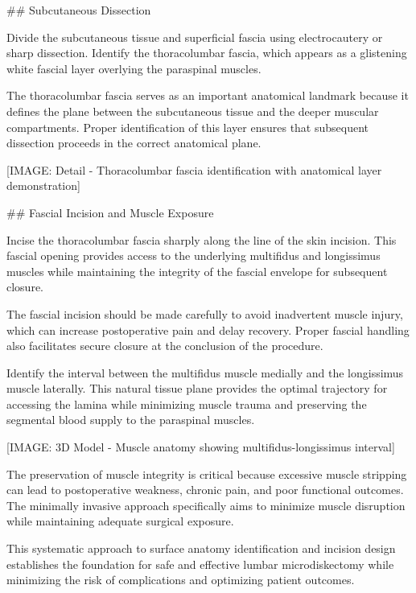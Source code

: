 \documentclass[12pt,a4paper]{article}
\begin{document}
\#\# Subcutaneous Dissection

Divide the subcutaneous tissue and superficial fascia using electrocautery or sharp dissection. Identify the thoracolumbar fascia, which appears as a glistening white fascial layer overlying the paraspinal muscles.

The thoracolumbar fascia serves as an important anatomical landmark because it defines the plane between the subcutaneous tissue and the deeper muscular compartments. Proper identification of this layer ensures that subsequent dissection proceeds in the correct anatomical plane.

[IMAGE: Detail - Thoracolumbar fascia identification with anatomical layer demonstration]

\#\# Fascial Incision and Muscle Exposure

Incise the thoracolumbar fascia sharply along the line of the skin incision. This fascial opening provides access to the underlying multifidus and longissimus muscles while maintaining the integrity of the fascial envelope for subsequent closure.

The fascial incision should be made carefully to avoid inadvertent muscle injury, which can increase postoperative pain and delay recovery. Proper fascial handling also facilitates secure closure at the conclusion of the procedure.

Identify the interval between the multifidus muscle medially and the longissimus muscle laterally. This natural tissue plane provides the optimal trajectory for accessing the lamina while minimizing muscle trauma and preserving the segmental blood supply to the paraspinal muscles.

[IMAGE: 3D Model - Muscle anatomy showing multifidus-longissimus interval]

The preservation of muscle integrity is critical because excessive muscle stripping can lead to postoperative weakness, chronic pain, and poor functional outcomes. The minimally invasive approach specifically aims to minimize muscle disruption while maintaining adequate surgical exposure.

This systematic approach to surface anatomy identification and incision design establishes the foundation for safe and effective lumbar microdiskectomy while minimizing the risk of complications and optimizing patient outcomes.
\end{document}
